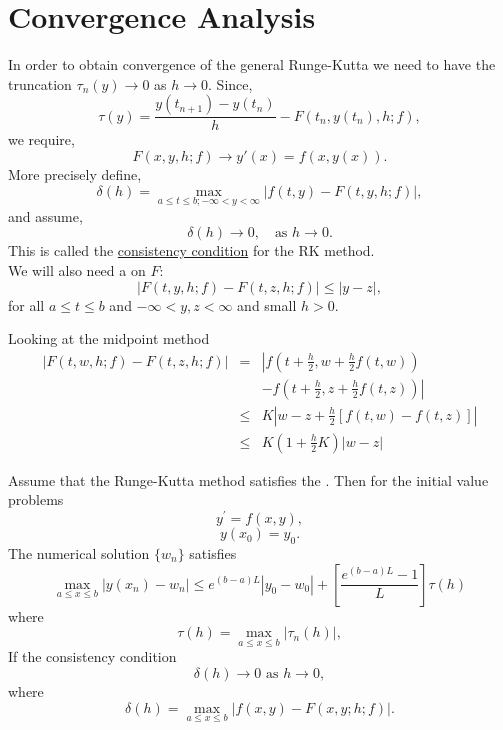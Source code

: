 \section{Convergence Analysis}
In order to obtain convergence of the general Runge-Kutta we need to have the truncation
$\tau_n(y)\rightarrow0$ as $h \rightarrow 0$.  Since,
\[\tau(y)=\frac{y(t_{n+1})-y(t_n)}{h}-F(t_n,y(t_n),h;f), \]
we require,
\[F(x,y,h;f)\rightarrow y{'}(x)=f(x,y(x)). \]
More precisely define,
\[\delta(h)= \max_{a\leq t \leq b ; -\infty < y <\infty} |f(t,y)-F(t,y,h;f)|, \]
and assume,
\begin{equation}
\label{C}
 \delta(h) \rightarrow 0, \ \ \ \mbox{ as } h \rightarrow 0.
 \end{equation}
This is called the \underline{consistency condition} for the RK method.\\
We will also need a  on $F$:
\begin{equation}
\label{L}
|F(t,y,h;f)-F(t,z,h;f)|\leq |y-z|,
 \end{equation}
for all $a\leq t \leq b$ and $-\infty <y,z < \infty $ and small $h >0$.
\begin{example}
Looking at the midpoint method
\begin{eqnarray*}
|F(t,w,h;f)-F(t,z,h;f)| &=&
\left|f(t+\frac{h}{2},w+\frac{h}{2}f(t,w)) \right. \\
& & \left. -f(t+\frac{h}{2},z+\frac{h}{2}f(t,z) )
 \right|\\
&\leq& K \left| w-z +\frac{h}{2}[f(t,w)-f(t,z) ]\right|\\
&\leq &	K \left(1 +\frac{h}{2}K \right)|w-z|
\end{eqnarray*}
\end{example}
\begin{theorem}
Assume that the Runge-Kutta method satisfies the . Then
for the initial value problems
\[ y^{'}=f(x,y),\]
\[ y(x_0)=y_0. \]
The numerical solution $\{ w_n\}$ satisfies
\[ \max_{a\leq x\leq b}|y(x_n)-w_n| \leq e^{(b-a)L}|y_0-w_0|+\left[\frac{e^{(b-a)L}-1}{L} \right]\tau(h) \]
where
\[\tau(h) = \max_{a\leq x\leq b}|\tau_n(h)|,\]
If the consistency condition 
\[ \delta(h) \rightarrow 0 \mbox{ as  } h\rightarrow 0, \]
where
\[\delta(h) = \max_{a \leq x \leq b}|f(x,y)-F(x,y;h;f)|. \]

\end{theorem}
